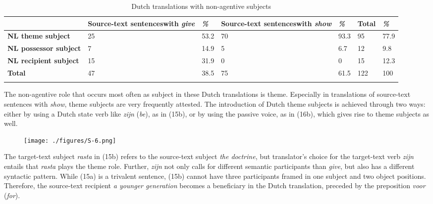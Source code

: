 \documentclass[output=paper]{LSP/langsci}
\begin{document}
\begin{table}
     \centering
     \begin{tabularx}{\textwidth}{XXXXXXX}
     \lsptoprule
     &  Source-text sentences\newline with \textit{give}   & \textit{\%}  & Source-text sentences\newline with \textit{show } & \textit{\%} & Total & \textit{\%} \\ \midrule
       \textbf{NL theme subject}  & 25    & 53.2      & 70	          & 93.3      & 95   & 77.9 \\
       \textbf{NL possessor subject}     & 7     & 14.9        & 5      & 6.7       & 12   & 9.8  \\
       \textbf{NL recipient subject}     & 15    & 31.9        & 0      & 0        & 15   & 12.3 \\  \midrule
       \textbf{Total}                    & 47    & 38.5        & 75     & 61.5       & 122   & 100  \\ 
\lspbottomrule
\end{tabularx}

     \caption{Dutch translations with non-agentive subjects}
     \label{5.4}
\end{table}
  

 
The non-agentive role that occurs most often as subject in these Dutch translations is theme. Especially in translations of source-text sentences with \textit{show}, theme subjects are very frequently attested. The introduction of Dutch theme subjects is achieved through two ways: either by using a Dutch state verb like \textit{zijn} (\textit{be}), as in (15b), or by using the passive voice, as in (16b), which gives rise to theme subjects as well.

\begin{figure}
\texttt{[image: ./figures/S-6.png]}
\end{figure}

The target-text subject \textit{rasta} in (15b) refers to the source-text subject \textit{the doctrine}, but translator’s choice for the target-text verb \textit{zijn} entails that \textit{rasta} plays the theme role. Further, \textit{zijn} not only calls for different semantic participants than \textit{give}, but also has a different syntactic pattern. While (15a) is a trivalent sentence, (15b) cannot have three participants framed in one subject and two object positions. Therefore, the source-text recipient \textit{a younger generation} becomes a beneficiary in the Dutch translation, preceded by the preposition \textit{voor} (\textit{for}).
\end{document}
